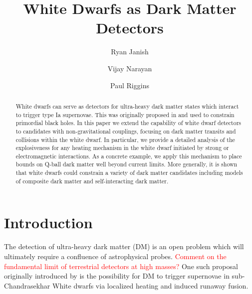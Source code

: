 \documentclass[twocolumn,showpacs,preprintnumbers,amsmath,amssymb,prd]{revtex4}
\begin{document}
\title{White Dwarfs as Dark Matter Detectors}


\author{Ryan Janish}

\author{Vijay Narayan}

\author{Paul Riggins}

\begin{abstract}

White dwarfs can serve as detectors for ultra-heavy dark matter states which interact to trigger type Ia supernovae. This was originally proposed in \cite{Graham:2015apa} and used to  constrain primordial black holes. In this paper we extend the capability of white dwarf detectors to candidates with non-gravitational couplings, focusing on dark matter transits and collisions within the white dwarf. In particular, we provide a detailed analysis of the explosiveness for any heating mechanism in the white dwarf initiated by strong or electromagnetic interactions. As a concrete example, we apply this mechanism to place bounds on Q-ball dark matter well beyond current limits. More generally, it is shown that white dwarfs could constrain a variety of dark matter candidates including models of composite dark matter and self-interacting dark matter.

\end{abstract}
\maketitle


\section{Introduction}
\label{sec:Introduction}

The detection of ultra-heavy dark matter (DM) is an open problem which will ultimately require a confluence of astrophysical probes. \textcolor{red}{Comment on the fundamental limit of terrestrial detectors at high masses?} One such proposal originally introduced by \cite{Graham:2015apa} is the possibility for DM to trigger supernovae in sub-Chandrasekhar White dwarfs via localized heating and induced runaway fusion.
\end{document}
